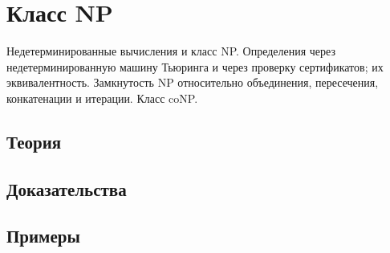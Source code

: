 
\section{Класс NP}
\label{sec:2.3a.11-class-np}

\begin{ticket}
Недетерминированные вычисления и класс NP. Определения через недетерминированную машину Тьюринга и через проверку сертификатов; их эквивалентность. Замкнутость NP относительно объединения, пересечения, конкатенации и итерации. Класс coNP.
\end{ticket}

\subsection*{Теория}

\subsection*{Доказательства}

\subsection*{Примеры}
